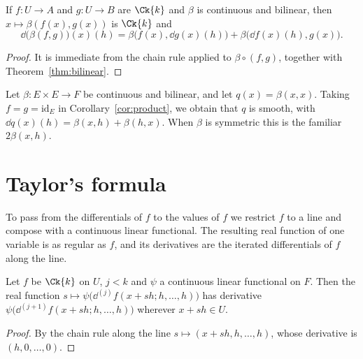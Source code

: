 \begin{corollary}
  \label{cor:product}
  \leanok
  If $f \colon U \to A$ and $g \colon U \to B$ are $\Ck{k}$ and $\beta$ is continuous and
  bilinear, then $x \mapsto \beta(f(x), g(x))$ is $\Ck{k}$ and
  \[
    \dd\bigl(\beta(f, g)\bigr)(x)(h) = \beta\bigl(f(x), \dd g(x)(h)\bigr)
      + \beta\bigl(\dd f(x)(h), g(x)\bigr).
  \]
\end{corollary}

\begin{proof}
  \leanok
  It is immediate from the chain rule applied to $\beta \circ (f, g)$, together with
  Theorem~\ref{thm:bilinear}.
\end{proof}

\begin{example}
  Let $\beta \colon E \times E \to F$ be continuous and bilinear, and let
  $q(x) = \beta(x, x)$. Taking $f = g = \mathrm{id}_E$ in Corollary~\ref{cor:product}, we
  obtain that $q$ is smooth, with $\dd q(x)(h) = \beta(x, h) + \beta(h, x)$. When $\beta$ is
  symmetric this is the familiar $2\beta(x, h)$.
\end{example}

\section{Taylor's formula}

To pass from the differentials of $f$ to the values of $f$ we restrict $f$ to a line and
compose with a continuous linear functional. The resulting real function of one variable is
as regular as $f$, and its derivatives are the iterated differentials of $f$ along the line.

\begin{lemma}
  \label{lem:line}
  \leanok
  Let $f$ be $\Ck{k}$ on $U$, $j < k$ and $\psi$ a continuous linear functional on $F$. Then
  the real function $s \mapsto \psi\bigl(\dd^{(j)} f(x + sh; h, \dots, h)\bigr)$ has derivative
  $\psi\bigl(\dd^{(j+1)} f(x + sh; h, \dots, h)\bigr)$ wherever $x + sh \in U$.
\end{lemma}

\begin{proof}
  \leanok
  By the chain rule along the line $s \mapsto (x + sh, h, \dots, h)$, whose derivative is
  $(h, 0, \dots, 0)$.
\end{proof}

